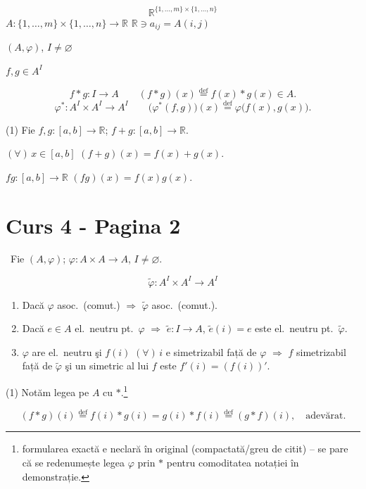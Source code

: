 \[
\mathbb{R}^{\{1,\ldots,m\}\times\{1,\ldots,n\}}
\]
\noindent $A : \{1,\ldots,m\}\times\{1,\ldots,n\} \to \mathbb{R}$ \hfill $\mathbb{R}\ni a_{ij} = A(i,j)$

\medskip
\noindent $(A,\varphi)$, $I\neq\varnothing$

\noindent $f,g\in A^I$

\[
f*g : I\to A \qquad (f*g)(x) \overset{\text{def}}{=} f(x)*g(x) \in A.
\]
\[
\varphi^* : A^I\times A^I \to A^I \qquad \big(\varphi^*(f,g)\big)(x) \overset{\text{def}}{=} \varphi\big(f(x),g(x)\big).
\]

\medskip
\noindent (1) Fie $f,g : [a,b]\to\mathbb{R}$; \quad $f+g : [a,b]\to\mathbb{R}$.

\noindent $(\forall)\, x\in[a,b]$ \qquad $(f+g)(x) = f(x)+g(x)$.

\noindent $fg : [a,b]\to\mathbb{R}$ \qquad $(fg)(x) = f(x)g(x)$.






\section*{Curs 4 - Pagina 2}

\noindent{} \ Fie $(A,\varphi)$; $\varphi : A\times A \to A$, $I\neq\varnothing$.

\[
\tilde\varphi : A^I \times A^I \to A^I
\]

\begin{enumerate}
\item[(1)] Dacă $\varphi$ asoc.\ (comut.) $\Rightarrow$ $\tilde\varphi$ asoc.\ (comut.).
\item[(2)] Dacă $e\in A$ el.\ neutru pt.\ $\varphi$ $\Rightarrow$ $\tilde e : I\to A$, $\tilde e(i)=e$ este el.\ neutru pt.\ $\tilde\varphi$.
\item[(3)] $\varphi$ are el.\ neutru şi $f(i)$ $(\forall)\,i$ e simetrizabil față de $\varphi$ $\Rightarrow$ $f$ simetrizabil față de $\tilde\varphi$ şi un simetric al lui $f$ este $f'(i) = (f(i))'$.
\end{enumerate}

\bigskip
\noindent (1) Notăm legea pe $A$ cu $*$.\footnote{formularea exactă e neclară în original (compactată/greu de citit) -- se pare că se redenumește legea $\varphi$ prin $*$ pentru comoditatea notației în demonstrație.}

\[
(f*g)(i) \overset{\text{def}}{=} f(i)*g(i) = g(i)*f(i) \overset{\text{def}}{=} (g*f)(i), \quad \text{adevărat.}
\]

